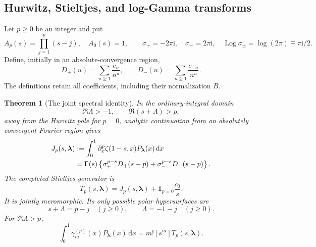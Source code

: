 \documentclass[11pt]{article}
\numberwithin{equation}{section}
\theoremstyle{plain}
\newtheorem{theorem}{Theorem}[section]
\theoremstyle{definition}
\theoremstyle{remark}
\DeclareMathOperator{\Log}{Log}
\newcommand{\ii}{\mathrm i}
\newcommand{\dd}{\,\mathrm d}
\begin{document}
\subsection{Hurwitz, Stieltjes, and log-Gamma transforms}

Let $p\ge0$ be an integer and put
\[
 A_p(s)=\prod_{j=1}^p(s-j),\quad A_0(s)=1,\qquad
 \sigma_+=-2\pi\ii,\quad \sigma_-=2\pi\ii,
 \quad \Log\sigma_\pm=\log(2\pi)\mp\pi\ii/2.
\]
Define, initially in an absolute-convergence region,
\begin{equation}\label{mr:Dirichlet}
 D_+(u)=\sum_{n\ge1}\frac{c_n}{n^u},\qquad
 D_-(u)=\sum_{n\ge1}\frac{c_{-n}}{n^u}.
\end{equation}
The definitions retain all coefficients, including their normalization $B$.

\begin{theorem}[The joint spectral identity]
\label{mr:hurwitz}
In the ordinary-integral domain
\[
 \Re\Lambda>-1,\qquad \Re(s+\Lambda)>p,
\]
away from the Hurwitz pole for $p=0$, analytic continuation from an
absolutely convergent Fourier region gives
\begin{align}
 J_p(s,\boldsymbol\lambda)
 &:=\int_0^1\partial_x^p\zeta(1-s,x)P_{\boldsymbol\lambda}(x)\dd x\notag\\
 &=\Gamma(s)\left\{\sigma_+^{p-s}D_+(s-p)
                      +\sigma_-^{p-s}D_-(s-p)\right\}.
       \label{mr:Hurwitz}
\end{align}
The completed Stieltjes generator is
\begin{equation}\label{mr:T}
 T_p(s,\boldsymbol\lambda)=J_p(s,\boldsymbol\lambda)
                                  +\mathbf1_{p=0}\frac{c_0}{s}.
\end{equation}
It is jointly meromorphic. Its only possible polar hypersurfaces are
\begin{equation}\label{mr:poles}
       s+\Lambda=p-j\quad(j\ge0),\qquad
       \Lambda=-1-j\quad(j\ge0).
\end{equation}
For $\Re\Lambda>p$,
\begin{equation}\label{mr:ordinaryStieltjes}
 \int_0^1\gamma_m^{(p)}(x)P_{\boldsymbol\lambda}(x)\dd x
                  =m![s^m]T_p(s,\boldsymbol\lambda).
\end{equation}
\end{theorem}
\end{document}
